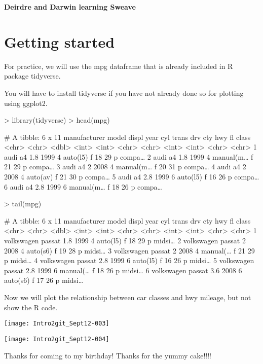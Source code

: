 \documentclass{article}
\begin{document}


\noindent \textbf{\Large{Deirdre and Darwin learning Sweave}}
\author{Deirdre & Darwin }

\section {Getting started}
\newline 

For practice, we will use the mpg dataframe that is already included in R package tidyverse. 

You will have to install tidyverse if you have not already done so for plotting using ggplot2.

\begin{Schunk}
\begin{Sinput}
> library(tidyverse)
> head(mpg)
\end{Sinput}
\begin{Soutput}
# A tibble: 6 x 11
  manufacturer model displ  year   cyl trans     drv     cty   hwy fl    class 
  <chr>        <chr> <dbl> <int> <int> <chr>     <chr> <int> <int> <chr> <chr> 
1 audi         a4      1.8  1999     4 auto(l5)  f        18    29 p     compa…
2 audi         a4      1.8  1999     4 manual(m… f        21    29 p     compa…
3 audi         a4      2    2008     4 manual(m… f        20    31 p     compa…
4 audi         a4      2    2008     4 auto(av)  f        21    30 p     compa…
5 audi         a4      2.8  1999     6 auto(l5)  f        16    26 p     compa…
6 audi         a4      2.8  1999     6 manual(m… f        18    26 p     compa…
\end{Soutput}
\end{Schunk}

\begin{Schunk}
\begin{Sinput}
> tail(mpg)
\end{Sinput}
\begin{Soutput}
# A tibble: 6 x 11
  manufacturer model  displ  year   cyl trans    drv     cty   hwy fl    class 
  <chr>        <chr>  <dbl> <int> <int> <chr>    <chr> <int> <int> <chr> <chr> 
1 volkswagen   passat   1.8  1999     4 auto(l5) f        18    29 p     midsi…
2 volkswagen   passat   2    2008     4 auto(s6) f        19    28 p     midsi…
3 volkswagen   passat   2    2008     4 manual(… f        21    29 p     midsi…
4 volkswagen   passat   2.8  1999     6 auto(l5) f        16    26 p     midsi…
5 volkswagen   passat   2.8  1999     6 manual(… f        18    26 p     midsi…
6 volkswagen   passat   3.6  2008     6 auto(s6) f        17    26 p     midsi…
\end{Soutput}
\end{Schunk}

Now we will plot the relationship between car classes and hwy mileage, but not show the R code.

\texttt{[image: Intro2git\_Sept12-003]}

\texttt{[image: Intro2git\_Sept12-004]}

Thanks for coming to my birthday!
Thanks for the yummy cake!!!!
\end{document}
